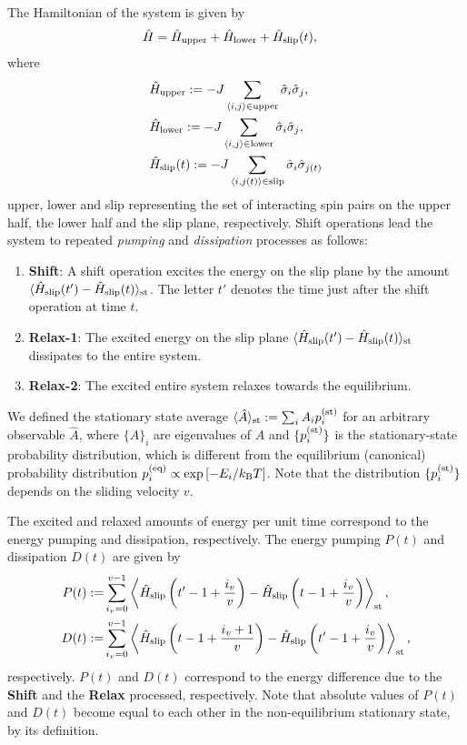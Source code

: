 The Hamiltonian of the system is given by
\begin{align}
&\hat{H}=\hat{H}_{\rm upper} + \hat{H}_{\rm lower} + \hat{H}_{\rm slip}(t),
\end{align}
where
\begin{align}
&\hat{H}_{\rm upper}:=-J\sum_{\langle i,j\rangle\in\mathrm{upper}}\hat{\sigma}_{i}\hat{\sigma}_{j}\label{ham:upper}, \\
&\hat{H}_{\rm lower}:=-J\sum_{\langle i,j\rangle\in\mathrm{lower}}\hat{\sigma}_{i}\hat{\sigma}_{j}\label{ham:lower}, \\
&\hat{H}_{\rm slip}(t):=-J\sum_{\langle i,j(t)\rangle\in\mathrm{slip}}\hat{\sigma}_{i}\hat{\sigma}_{j(t)}\label{ham:slip}
\end{align}
upper, lower and slip representing the set of interacting spin pairs on the upper half, the lower half and the slip plane, respectively.
Shift operations lead the system to repeated \textit{pumping} and \textit{dissipation} processes as follows:
\begin{enumerate}
	\item \textbf{Shift}: A shift operation excites the energy on the slip plane by the amount $\langle\hat{H}_{\rm slip}(t')-\hat{H}_{\rm slip}(t)\rangle_{\rm st}$. The letter $t'$ denotes the time just after the shift operation at time $t$.
	\item \textbf{Relax-1}: The excited energy on the slip plane $\langle\hat{H}_{\rm slip}(t')-\hat{H}_{\rm slip}(t)\rangle_{\rm st}$ dissipates to the entire system.
	\item \textbf{Relax-2}: The excited entire system relaxes towards the equilibrium.
\end{enumerate}
We defined the stationary state average $\langle\hat{A}\rangle_{\rm st}:=\sum_{i}A_{i}p^{(\rm st)}_{i}$ for an arbitrary observable $\hat{A}$, where $\{A\}_{i}$ are eigenvalues of $\hat{A}$ and $\{p^{(\rm st)}_{i}\}$ is the stationary-state probability distribution, which is different from the equilibrium (canonical) probability distribution $p^{(\rm eq)}_{i}\propto\exp\left[-E_{i}/k_{\rm B} T\right]$. Note that the distribution $\{p^{(\rm st)}_{i}\}$ depends on the sliding velocity $v$. 

The excited and relaxed amounts of energy per unit time correspond to the energy pumping and dissipation, respectively. The energy pumping $P(t)$ and dissipation $D(t)$ are given by
\begin{align}
P(t):=&\sum_{i_{v}=0}^{v-1}\left\langle \hat{H}_{\rm slip}\left(t'-1+\frac{i_{v}}{v}\right) - \hat{H}_{\rm slip}\left(t-1+\frac{i_{v}}{v}\right)\right\rangle_{\rm st},\\
D(t):=&\sum_{i_{v}=0}^{v-1}\left\langle \hat{H}_{\rm slip}\left(t-1+\frac{i_{v}+1}{v}\right) - \hat{H}_{\rm slip}\left(t'-1+\frac{i_{v}}{v}\right)\right\rangle_{\rm st},
\end{align}
respectively. $P(t)$ and $D(t)$ correspond to the energy difference due to the \textbf{Shift} and the \textbf{Relax} processed, respectively. Note that absolute values of $P(t)$ and $D(t)$ become equal to each other in the non-equilibrium stationary state, by its definition.

